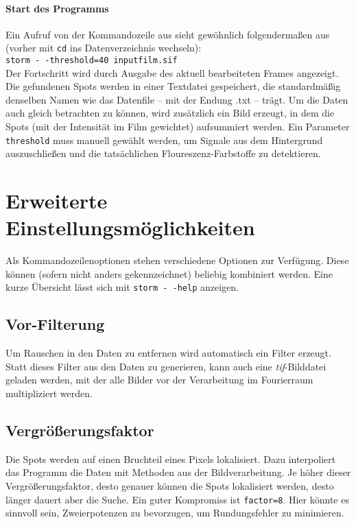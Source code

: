 \documentclass[DIV12,a4paper]{scrartcl}
\begin{document}
\paragraph{Start des Programms} 
Ein Aufruf von der Kommandozeile aus sieht gewöhnlich folgendermaßen aus
(vorher mit \texttt{cd} ins Datenverzeichnis wechseln):\\
\texttt{storm -\,-threshold=40 inputfilm.sif}\\
Der Fortschritt wird durch Ausgabe des aktuell bearbeiteten Frames angezeigt.
Die gefundenen Spots werden in einer Textdatei gespeichert, die standardmäßig
denselben Namen wie das Datenfile -- mit der Endung .txt -- trägt. %
Um die Daten auch gleich betrachten zu können, wird zusätzlich ein Bild erzeugt, 
in dem die Spots (mit der Intensität im Film gewichtet) aufsummiert werden. 
Ein Parameter \texttt{threshold} muss manuell gewählt werden, um Signale 
aus dem Hintergrund auszuschließen und die tatsächlichen Floureszenz-Farbstoffe 
zu detektieren.

\section{Erweiterte Einstellungsmöglichkeiten}
Als Kommandozeilenoptionen stehen verschiedene Optionen zur Verfügung.
Diese können (sofern nicht anders gekennzeichnet) beliebig kombiniert werden.
Eine kurze Übersicht lässt sich mit \texttt{storm -\,-help} anzeigen.

\subsection{Vor-Filterung}
Um Rauschen in den Daten zu entfernen wird automatisch ein Filter erzeugt.
Statt dieses Filter aus den Daten zu generieren, kann auch eine \emph{tif}-Bilddatei 
geladen werden, mit der alle Bilder vor der Verarbeitung im Fourierraum 
multipliziert werden. 

\subsection{Vergrößerungsfaktor}
Die Spots werden auf einen Bruchteil eines Pixels lokalisiert. Dazu interpoliert 
das Programm die Daten mit Methoden aus der Bildverarbeitung. Je höher dieser 
Vergrößerungsfaktor, desto genauer können die Spots lokalisiert werden, desto 
länger dauert aber die Suche. Ein guter Kompromiss ist \texttt{factor=8}.
Hier könnte es sinnvoll sein, Zweierpotenzen zu bevorzugen, um Rundungsfehler 
zu minimieren.
\end{document}
